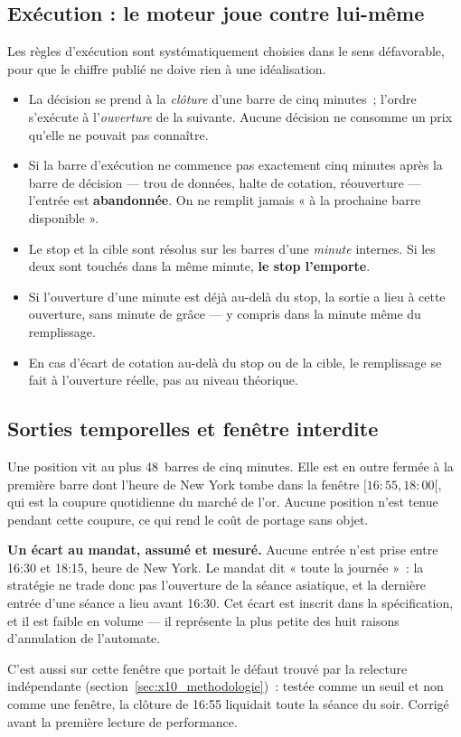 \subsection{Exécution : le moteur joue contre lui-même}

Les règles d'exécution sont systématiquement choisies dans le sens
défavorable, pour que le chiffre publié ne doive rien à une idéalisation.

\begin{itemize}
  \item La décision se prend à la \emph{clôture} d'une barre de cinq minutes~;
  l'ordre s'exécute à l'\emph{ouverture} de la suivante. Aucune décision ne
  consomme un prix qu'elle ne pouvait pas connaître.
  \item Si la barre d'exécution ne commence pas exactement cinq minutes après
  la barre de décision --- trou de données, halte de cotation, réouverture ---
  l'entrée est \textbf{abandonnée}. On ne remplit jamais « à la prochaine
  barre disponible ».
  \item Le stop et la cible sont résolus sur les barres d'une \emph{minute}
  internes. Si les deux sont touchés dans la même minute, \textbf{le stop
  l'emporte}.
  \item Si l'ouverture d'une minute est déjà au-delà du stop, la sortie a lieu
  à cette ouverture, sans minute de grâce --- y compris dans la minute même du
  remplissage.
  \item En cas d'écart de cotation au-delà du stop ou de la cible, le
  remplissage se fait à l'ouverture réelle, pas au niveau théorique.
\end{itemize}

\subsection{Sorties temporelles et fenêtre interdite}

Une position vit au plus 48~barres de cinq minutes. Elle est en outre fermée à
la première barre dont l'heure de New York tombe dans la fenêtre
$[16{:}55, 18{:}00[$, qui est la coupure quotidienne du marché de l'or.
Aucune position n'est tenue pendant cette coupure, ce qui rend le coût de
portage sans objet.

\begin{warningbox}
\textbf{Un écart au mandat, assumé et mesuré.} Aucune entrée n'est prise entre
16:30 et 18:15, heure de New York. Le mandat dit « toute la journée »~: la
stratégie ne trade donc pas l'ouverture de la séance asiatique, et la dernière
entrée d'une séance a lieu avant 16:30. Cet écart est inscrit dans la
spécification, et il est faible en volume --- il représente la plus petite des
huit raisons d'annulation de l'automate.

C'est aussi sur cette fenêtre que portait le défaut trouvé par la relecture
indépendante (section~\ref{sec:x10_methodologie})~: testée comme un seuil et
non comme une fenêtre, la clôture de 16:55 liquidait toute la séance du soir.
Corrigé avant la première lecture de performance.
\end{warningbox}

